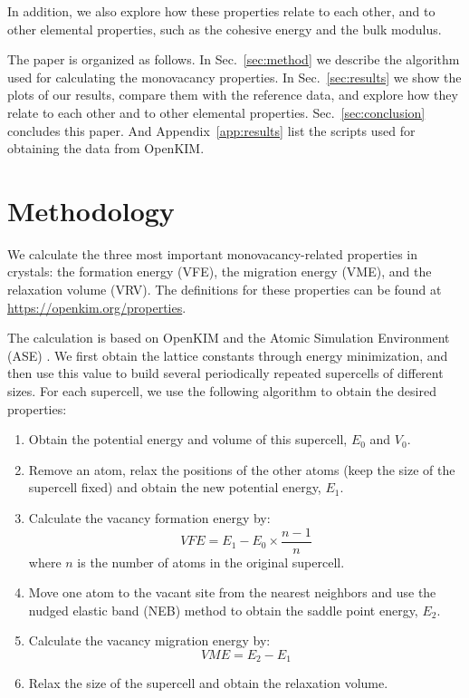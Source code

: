 \documentclass[%
 reprint,
 amsmath,amssymb,
 aps,
]{revtex4-1}
\begin{document}
In addition, we also explore how these properties relate to each other, and to other elemental properties, such as the cohesive energy and the bulk modulus.

The paper is organized as follows.
In Sec.~\ref{sec:method} we describe the algorithm used for calculating the monovacancy properties.
In Sec.~\ref{sec:results} we show the plots of our results, compare them with the reference data, and explore how they relate to each other and to other elemental properties.
Sec.~\ref{sec:conclusion} concludes this paper.
And Appendix~\ref{app:results} list the scripts used for obtaining the data from OpenKIM.

\section{\label{sec:method}Methodology}

We calculate the three most important monovacancy-related properties in crystals: the formation energy (VFE), the migration energy (VME), and the relaxation volume (VRV).
The definitions for these properties can be found at \url{https://openkim.org/properties}.

The calculation is based on OpenKIM and the Atomic Simulation Environment (ASE) \cite{bahn2002object}.
We first obtain the lattice constants through energy minimization, and then use this value to build several periodically repeated supercells of different sizes.
For each supercell, we use the following algorithm to obtain the desired properties:

\begin{enumerate}
 \item Obtain the potential energy and volume of this supercell, $E_0$ and $V_0$.
 \item Remove an atom, relax the positions of the other atoms (keep the size of the supercell fixed) and obtain the new potential energy, $E_1$.
 \item Calculate the vacancy formation energy by:
 \begin{equation}
 \label{eq:vfecalc}
 \mathit{VFE} = E_1 - E_0 \times \frac{n - 1}{n}
 \end{equation}
 where $n$ is the number of atoms in the original supercell.
 \item Move one atom to the vacant site from the nearest neighbors and use the nudged elastic band (NEB) method to obtain the saddle point energy, $E_2$.
 \item Calculate the vacancy migration energy by:
 \begin{equation}
 \label{eq:vmecalc}
 \mathit{VME} = E_2 - E_1
 \end{equation}
 \item Relax the size of the supercell and obtain the relaxation volume.
\end{enumerate}
\end{document}
